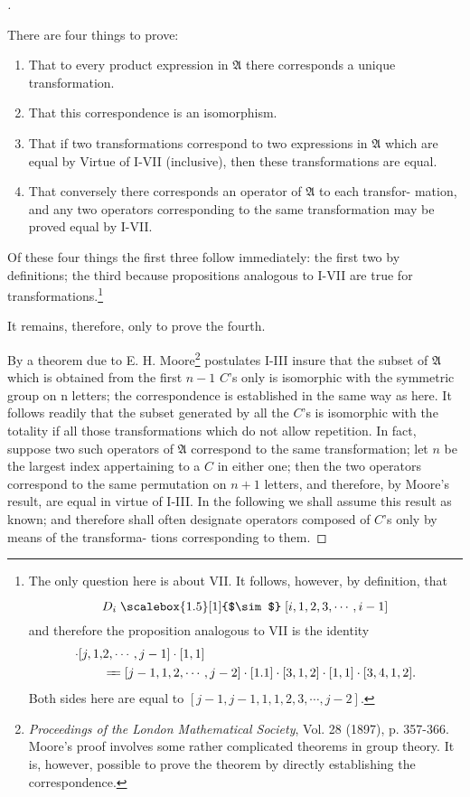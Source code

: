 \documentclass[10pt, twoside]{extarticle}
\def\varequals#1{\mathrel{\leaders\hbox to3pt{$=$\hss}\hskip#1=}}
\newcommand\longeq{\varequals{0.4em}}
\newcommand{\widesim}[2][1.5]{
  \mathrel{\overset{#2}{\scalebox{#1}[1]{$\sim$}}}
}
\newcommand\longsim{\widesim{}}
\theoremstyle{breaktheorem}
\theoremstyle{mylemma}
\theoremstyle{mydefinition}
\theoremstyle{mycorollary}
\newenvironment{proofnewlineindent}[1][\proofname]{%
  \begin{proof}[\indent#1]$ $\par\nobreak\ignorespaces
}{%
  \end{proof}
}
\begin{document}
\begin{proofnewlineindent}
  There are four things to prove:
  \begin{enumerate}[label=\arabic*)]
  \item That to every product expression in \(\mathfrak{A}\) there corresponds a unique
    transformation.
  \item That this correspondence is an isomorphism.
  \item That if two transformations correspond to two expressions in \(\mathfrak{A}\) which
    are equal by Virtue of I-VII (inclusive), then these transformations are equal.
  \item That conversely there corresponds an operator of \(\mathfrak{A}\) to each transfor-
    mation, and any two operators corresponding to the same transformation may
    be proved equal by I-VII.
  \end{enumerate}

  Of these four things the first three follow immediately: the first two
  by definitions; the third because propositions analogous to I-VII are true
  \setcounter{footnote}{1} %
  for transformations.\footnote{The only question here is about VII. It follows, however, by definition, that
    \[D_i \longsim [i, 1, 2, 3, \cdots, i-1]\]
    and therefore the proposition analogous to VII is the identity
    \begin{align*}
      [1, 1] \cdot [j, 1, &2, \cdots, j-1] \cdot [1,1] \\
      &\longeq [j-1, 1, 2, \cdots, j-2] \cdot [1. 1] \cdot [3, 1, 2] \cdot [1, 1] \cdot [3, 4, 1, 2].
    \end{align*}
    Both sides here are equal to \([j-1, j-1, 1, 1, 2, 3, \cdots, j-2].\)
  }

  \noindent It remains, therefore, only to prove the fourth.

  By a theorem due to E. H. Moore\footnote{\textit{Proceedings of the London Mathematical Society}, Vol. 28 (1897), p. 357-366. Moore's proof involves some rather complicated theorems in group theory. It is, however, possible to prove the theorem by directly establishing the correspondence.} postulates I-III insure that the
  subset of \(\mathfrak{A}\) which is obtained from the first \(n-1\) \(C\)'s only is isomorphic
  with the symmetric group on n letters; the correspondence is established in
the same way as here. It follows readily that the subset generated by all the
\(C\)'s is isomorphic with the totality if all those transformations which do
not allow repetition. In fact, suppose two such operators of \(\mathfrak{A}\) correspond
to the same transformation; let \(n\) be the largest index appertaining to a \(C\)
in either one; then the two operators correspond to the same permutation on
\(n + 1\) letters, and therefore, by Moore's result, are equal in virtue of I-III.
In the following we shall assume this result as known; and therefore shall
often designate operators composed of \(C\)'s only by means of the transforma-
tions corresponding to them.


\end{proofnewlineindent}
\end{document}
